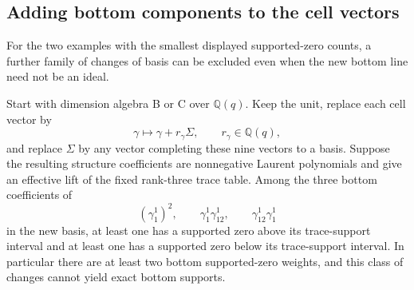 \subsection{Adding bottom components to the cell vectors}\label{sec:bottom-shift-obstruction}
For the two examples with the smallest displayed supported-zero counts, a further family of changes of basis can be excluded even when the new bottom line need not be an ideal.

\begin{proposition}\label{prop:bottom-shift-obstruction}
Start with dimension algebra B or C over $\mathbb Q(q)$. Keep the unit, replace each cell vector by
\[
 \gamma\longmapsto\gamma+r_\gamma\Sigma,
 \qquad r_\gamma\in\mathbb Q(q),
\]
and replace $\Sigma$ by any vector completing these nine vectors to a basis. Suppose the resulting structure coefficients are nonnegative Laurent polynomials and give an effective lift of the fixed rank-three trace table. Among the three bottom coefficients of
\[
 (\gamma_1^1)^2,\qquad
 \gamma_1^1\gamma_{12}^1,\qquad
 \gamma_{12}^1\gamma_1^1
\]
in the new basis, at least one has a supported zero above its trace-support interval and at least one has a supported zero below its trace-support interval. In particular there are at least two bottom supported-zero weights, and this class of changes cannot yield exact bottom supports.
\end{proposition}

